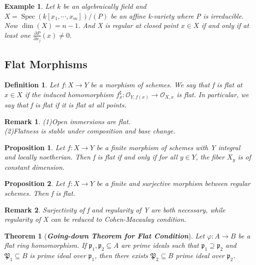 \documentclass{ctexart}
\newtheorem{definition}{Definition}[section]
\newtheorem{remark}{Remark}[section]
\newtheorem{theorem}{Theorem}[section]
\newtheorem{proposition}{Proposition}[section]
\newtheorem{example}{Example}[section]
\newcommand{\spec}{\operatorname{Spec}}
\begin{document}
\begin{example}
    Let $k$ be an algebraically field and $X = \spec(k[x_{1}, \cdots, x_{m}])/(P)$ be an affine k-variety where P is irreducible.
    Now $\dim(X) = n - 1$.
    And X is regular at closed point $x\in X$ if and only if at least one $\frac{\partial P}{\partial x_{j}}(x) \neq 0$.
\end{example}
\subsection{Flat Morphisms}
\begin{definition}
    Let $f: X \longrightarrow Y$ be a morphism of schemes.
    We say that f is flat at $x\in X$ if the induced homomorphism $f_{x}^{\sharp}: \mathcal{O}_{Y, f(x)} \longrightarrow \mathcal{O}_{X, x}$ is flat.
    In particular, we say that f is flat if it is flat at all points.
\end{definition}
\begin{remark}
    (1)Open immersions are flat. \\
    (2)Flatness is stable under composition and base change.
\end{remark}
\begin{proposition}
    Let $f: X \longrightarrow Y$ be a finite morphism of schemes with Y integral and locally noetherian.
    Then f is flat if and only if for all $y\in Y$, the fiber $X_{y}$ is of constant dimension.
    \label{Proposition 5.4}
\end{proposition}
\begin{proposition}
    Let $f: X \longrightarrow Y$ be a finite and surjective morphism between regular schemes.
    Then f is flat.
    \label{Proposition 5.5}
\end{proposition}
\begin{remark}
    Surjectivity of f and regularity of Y are both necessary, while regularity of X can be reduced to Cohen-Macaulay condition.
\end{remark}
\begin{theorem}[\textbf{\emph{Going-down Theorem for Flat Condition}}]
    Let $\varphi: A \longrightarrow B$ be a flat ring homomorphism.
    If $\mathfrak{p}_{1},\mathfrak{p}_{2} \subseteq A$ are prime ideals such that $\mathfrak{p}_{1} \supseteq \mathfrak{p}_{2}$ and $\mathfrak{P}_{1} \subseteq B$ is prime ideal over $\mathfrak{p}_{1}$,
    then there exists $\mathfrak{P}_{2} \subseteq B$ prime ideal over $\mathfrak{p}_{2}$.
    \label{Theorem 5.4}
\end{theorem}
\end{document}
